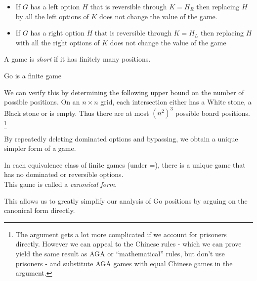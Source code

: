 \documentclass[../math194_paper.tex]{subfiles}
\begin{document}
\begin{theorem} \label{bypassing}\:
    \begin{itemize} 
        \item If $G$ has a left option $H$ that is reversible through $K=H_R$ then 
        replacing $H$ by all the left options of $K$ does not change the value of the game.
        \item If $G$ has a right option $H$ that is reversible through $K=H_L$ then 
        replacing $H$ with all the right options of $K$ does not change the value of the 
        game
    \end{itemize}
\end{theorem}

\begin{definition}
    A game is \textit{short} if it has finitely many positions.
\end{definition}

\begin{lemma}
    Go is a finite game
\end{lemma}
We can verify this by determining the following 
upper bound on the number of possible positions. On an $n \times n$ grid, each intersection
either has a White stone, a Black stone or is empty. Thus there are at most $(n^2)^3$
possible board positions. \footnote{
    The argument gets a lot more complicated if we account for prisoners directly. However 
    we can appeal to the Chinese rules - which we can prove yield the same result as 
    AGA or ``mathematical'' rules, but don't use prisoners - and substitute AGA games 
    with equal Chinese games in the argument.
}

By repeatedly deleting dominated options and bypassing, we obtain a unique simpler form 
of a game.
\begin{definition}
    \label{canonical}
    In each equivalence class of finite games (under =), there is a unique game that has no dominated
    or reversible options. \\
    This game is called a \textit{canonical form}.
\end{definition}
This allows us to greatly simplify our analysis of Go positions by arguing on the canonical 
form directly. 
\end{document}
